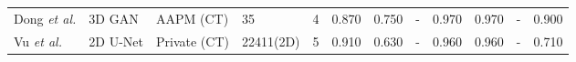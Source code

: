 \documentclass[lettersize,journal]{IEEEtran}
\begin{document}
{\begin{table*}[ht!]
{\begin{tabular}{@{}llllllllllll@{}}
Dong {\it{et al.}} \cite{84}                                                                   & 3D GAN                                                      & AAPM (CT) \cite{31}                                                                    & 35                                              & 4                                             & 0.870                                                 & 0.750                                                 & -                                                     & 0.970                                         & 0.970                                         & -                                                     & 0.900                                         \\
Vu {\it{et al.}} \cite{85}                                                                     & 2D U-Net                                                    & Private (CT)                                                                          & 22411(2D)                                       & 5                                             & 0.910                                                 & 0.630                                                 & -                                                     & 0.960                                         & 0.960                                         & -                                                     & 0.710                                         \\

\end{tabular}}
\end{table*}}
\end{document}
